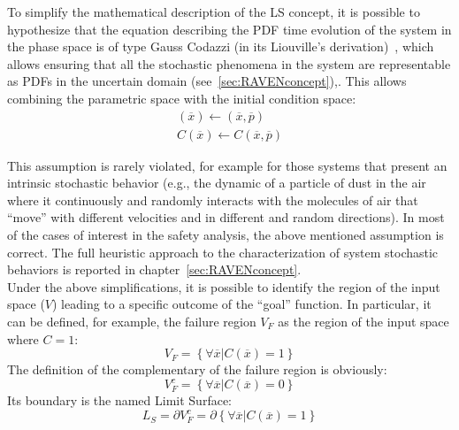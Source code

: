 To simplify the mathematical description of the LS concept, it is 
possible to hypothesize that the 
equation describing the PDF time evolution of the system in the phase 
space is of type Gauss 
Codazzi (in its Liouville’s derivation)~\cite{}, which allows ensuring that all the 
stochastic phenomena in 
the system are representable as PDFs in the uncertain domain 
(see~\ref{sec:RAVENconcept}),. This allows combining the 
parametric space with the initial condition space:
\begin{equation}
  \label{eq:goalFunctionCodazzi}
  \begin{matrix} 
  \left ( \overline{x} \right ) \leftarrow \left ( \overline{x},\overline{p} \right ) \\
  C\left ( \overline{x} \right ) \leftarrow C\left ( \overline{x},\overline{p} \right )
  \end{matrix}
\end{equation}

This assumption is rarely violated, for example for those systems that 
present an intrinsic 
stochastic behavior (e.g., the dynamic of a particle of dust in the air 
where it continuously and 
randomly interacts with the molecules of air that ``move'' with different velocities and in different 
and random directions). In most of the cases of interest in the safety analysis, the above 
mentioned assumption is correct. The full heuristic approach to the characterization of system stochastic behaviors is reported in chapter~\ref{sec:RAVENconcept}.
\\Under the above simplifications, it is possible to identify the region of the input space ($V$) 
leading to a specific outcome of the ``goal'' function. In particular, it can be defined, for example, 
the failure region $V_{F}$ as the region of the input space where $C=1$:
\begin{equation}
 \label{eq:failureRegion}
V_{F}=\left \{ \forall \overline{x} | C\left ( \overline{x} \right ) = 1 \right \}
\end{equation}
The definition of the complementary of the failure region is obviously:
\begin{equation}
V_{F}^{c}=\left \{ \forall \overline{x} | C\left ( \overline{x} \right ) = 0 \right \}
\end{equation}
Its boundary is the named Limit Surface:
\begin{equation}
L_{S}= \partial V_{F}^{c}= \partial      \left \{ \forall \overline{x} | C\left ( \overline{x} \right ) = 1 \right \}
\end{equation}

